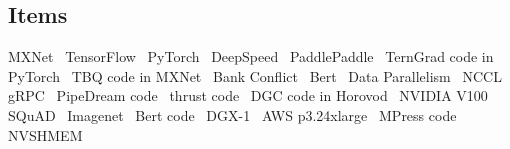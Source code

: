\subsection{Items}

MXNet~\cite{chen2015mxnet, MXNetWebsite}
TensorFlow~\cite{Tensorflow}
PyTorch~\cite{Pytorch}
DeepSpeed~\cite{DeepSpeedCode,rasley2020deepspeed}
PaddlePaddle~\cite{paddlepaddlecode}
TernGrad code in PyTorch~\cite{open-source-Terngrad}
TBQ code in MXNet~\cite{open-source-TBQ}
Bank Conflict~\cite{bank-conflicts-in-GPU}
Bert~\cite{devlin2018bert}
Data Parallelism~\cite{dean2012large}
NCCL~\cite{NCCL}
gRPC~\cite{grpc}
PipeDream code~\cite{pipedreamcode}
thrust code~\cite{thrust}
DGC code in Horovod~\cite{horovoddgc}
NVIDIA V100~\cite{NVIDIAV100}
SQuAD~\cite{SQuAD}
Imagenet~\cite{Imagenet}
Bert code~\cite{bertgithub}
DGX-1~\cite{dgx-1-whitepaper}
AWS p3.24xlarge~\cite{awsp324xlarge}
MPress code~\cite{mpressopensource}
NVSHMEM~\cite{NVSHMEM}